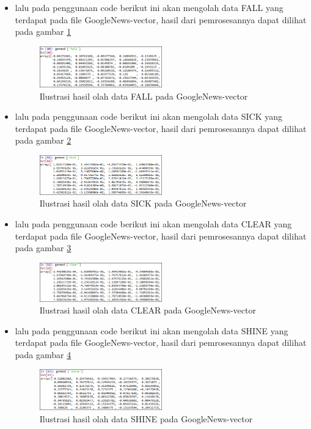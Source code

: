 \begin{enumerate}
\begin{itemize}
\item  lalu pada penggunaan code berikut ini akan mengolah data FALL yang terdapat pada file GoogleNews-vector, hasil dari pemrosesannya dapat dilihat pada gambar \ref{fig9}
\begin{figure}[!htbp]
	\centering
	\includegraphics[width=0.5\textwidth]{figures/fathi/chapter5/hari2/4}
	\caption{Ilustrasi hasil olah data FALL pada GoogleNews-vector}
	\label{fig9}
\end{figure}

\item  lalu pada penggunaan code berikut ini akan mengolah data SICK yang terdapat pada file GoogleNews-vector, hasil dari pemrosesannya dapat dilihat pada gambar \ref{fig10}
\begin{figure}[!htbp]
	\centering
	\includegraphics[width=0.5\textwidth]{figures/fathi/chapter5/hari2/5}
	\caption{Ilustrasi hasil olah data SICK pada GoogleNews-vector}
	\label{fig10}
\end{figure}

\item  lalu pada penggunaan code berikut ini akan mengolah data CLEAR yang terdapat pada file GoogleNews-vector, hasil dari pemrosesannya dapat dilihat pada gambar \ref{fig11}
\begin{figure}[!htbp]
	\centering
	\includegraphics[width=0.5\textwidth]{figures/fathi/chapter5/hari2/6}
	\caption{Ilustrasi hasil olah data CLEAR pada GoogleNews-vector}
	\label{fig11}
\end{figure}

\item  lalu pada penggunaan code berikut ini akan mengolah data SHINE yang terdapat pada file GoogleNews-vector, hasil dari pemrosesannya dapat dilihat pada gambar \ref{fig12}
\begin{figure}[!htbp]
	\centering
	\includegraphics[width=0.5\textwidth]{figures/fathi/chapter5/hari2/7}
	\caption{Ilustrasi hasil olah data SHINE pada GoogleNews-vector}
	\label{fig12}
\end{figure}


\end{itemize}
\end{enumerate}
